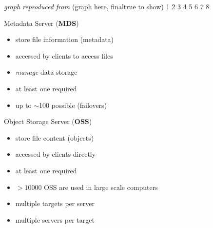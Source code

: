 \begin{frame}
{
    }

    \hfill{\scriptsize\emph{graph reproduced from \cite{whitepaper}}}
\else
    (graph here, finaltrue to show)
     {1}
     {2}
     {3}
     {4}
     {5}
     {6}
     {7}
     {8}
\fi
\end{frame}

\begin{frame}{Metadata Server (\textbf{MDS})}
    \begin{itemize}
        \item store file information (metadata)
        \item accessed by clients to access files
        \item \emph{manage} data storage
        \item at least one required
        \item up to $\sim$100 possible (failovers)
    \end{itemize}
\end{frame}


\begin{frame}{Object Storage Server (\textbf{OSS})}
    \begin{itemize}
        \item store file content (objects)
        \item accessed by clients directly
        \item at least one required
        \item $>10000$ OSS are used in large scale computers
        \item multiple targets per server
        \item multiple servers per target
    \end{itemize}
\end{frame}



